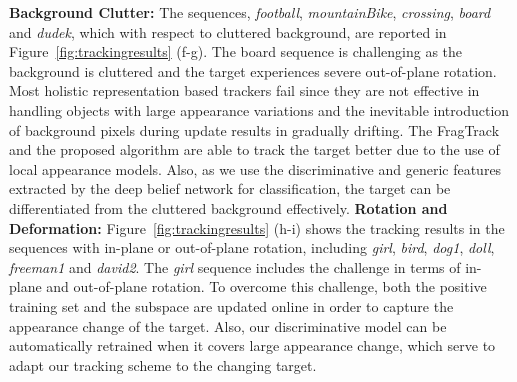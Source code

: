 \documentclass[preprint,12pt,review]{elsarticle}
\begin{document}
%
{\flushleft \bf{Background Clutter:}}
The sequences, \emph{football}, \emph{mountainBike}, \emph{crossing}, \emph{board} and \emph{dudek}, which with respect to cluttered background, are reported in Figure~\ref{fig:trackingresults} (f-g).
%
The board sequence is challenging as the background is cluttered and the target experiences severe out-of-plane rotation.
%
Most holistic representation based trackers fail since they are not effective in handling objects with large appearance variations and the inevitable introduction of background pixels during update results in gradually drifting.
%
The FragTrack and the proposed algorithm are able to track the target better due to the use of local appearance models.
%
Also, as we use the discriminative and generic features extracted by the deep belief network for classification, the target can be differentiated from the cluttered background effectively.
{\flushleft \bf{Rotation and Deformation:}}
Figure~\ref{fig:trackingresults} (h-i) shows the tracking results in the sequences with in-plane or out-of-plane rotation, including \emph{girl}, \emph{bird}, \emph{dog1}, \emph{doll}, \emph{freeman1} and \emph{david2}.
%
The \emph{girl} sequence includes the challenge in terms of in-plane and out-of-plane rotation.
%
To overcome this challenge, both the positive training set and the subspace are updated online in order to capture the appearance change of the target.
%
Also, our discriminative model can be automatically retrained when it covers large appearance change, which serve to adapt our tracking scheme to the changing target.
\end{document}
